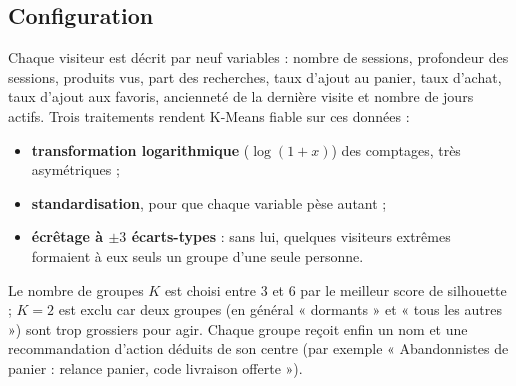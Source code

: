 \subsection{Configuration}
Chaque visiteur est décrit par neuf variables : nombre de sessions, profondeur des sessions, produits vus, part des recherches, taux d'ajout au panier, taux d'achat, taux d'ajout aux favoris, ancienneté de la dernière visite et nombre de jours actifs. Trois traitements rendent K-Means fiable sur ces données :
\begin{itemize}
  \item \textbf{transformation logarithmique} ($\log(1+x)$) des comptages, très asymétriques ;
  \item \textbf{standardisation}, pour que chaque variable pèse autant ;
  \item \textbf{écrêtage à $\pm 3$ écarts-types} : sans lui, quelques visiteurs extrêmes formaient à eux seuls un groupe d'une seule personne.
\end{itemize}
Le nombre de groupes $K$ est choisi entre 3 et 6 par le meilleur score de silhouette ; $K = 2$ est exclu car deux groupes (en général « dormants » et « tous les autres ») sont trop grossiers pour agir. Chaque groupe reçoit enfin un nom et une recommandation d'action déduits de son centre (par exemple « Abandonnistes de panier : relance panier, code livraison offerte »).

